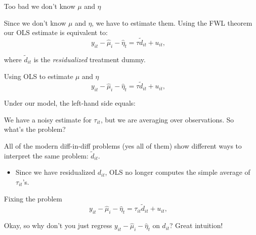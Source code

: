 \documentclass[t]{beamer}
\begin{document}
\begin{frame}{Too bad we don't know $\mu$ and $\eta$}

  Since we don't know $\mu$ and $\eta$, we have to estimate them. Using the FWL theorem our OLS estimate is equivalent to: 
  $$
    y_{it} - \hat{\mu}_i - \hat{\eta}_t = \tau \tilde{d}_{it} + u_{it},
  $$

  where $\tilde{d}_{it}$ is the \emph{residualized} treatment dummy.
\end{frame}

\begin{frame}{Using OLS to estimate $\mu$ and $\eta$}
  $$
    y_{it} - \hat{\mu}_i - \hat{\eta}_t = \tau \tilde{d}_{it} + u_{it},
  $$
  
  \bigskip
  Under our model, the left-hand side equals:
  
  \pause
  We have a noisy estimate for $\tau_{it}$, but we are averaging over observations. So what's the problem? 
  
  \bigskip
  \pause
  All of the modern diff-in-diff problems (yes all of them) show different ways to interpret the same problem: $\tilde{d}_{it}$.
  \begin{itemize}
    \item Since we have residualized $d_{it}$, OLS no longer computes the simple average of $\tau_{it}$'s.
  \end{itemize}
\end{frame}

\begin{frame}{Fixing the problem}
  $$
  y_{it} - \hat{\mu}_i - \hat{\eta}_t = \tau_{it} \tilde{d}_{it} + u_{it},
  $$

  \bigskip
  Okay, so why don't you just regress $y_{it} - \hat{\mu}_i - \hat{\eta}_t$ on $d_{it}$? \pause Great intuition!
\end{frame}
\end{document}
